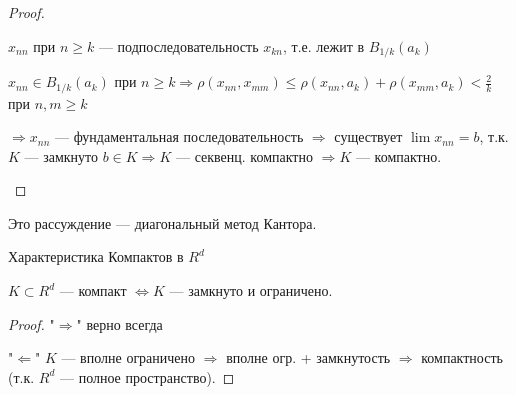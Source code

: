\begin{theorem-non}
\begin{proof}
\begin{enumerate}
            $x_{nn}$ при $n \geqslant k$ --- подпоследовательность $x_{kn}$, т.е. лежит в $B_{1/k}(a_k)$

            $x_{nn} \in B_{1/k}(a_k)$ при $n \geqslant k \Longrightarrow \rho(x_{nn}, x_{mm}) \leqslant \rho(x_{nn}, a_k) + \rho(x_{mm}, a_k) < \frac{2}{k}$ при $n,m \geqslant k$

            $\Longrightarrow x_{nn}$ --- фундаментальная последовательность $\Longrightarrow$ существует $\lim{x_{nn}}= b$, т.к. $K$ --- замкнуто $b \in K \Longrightarrow K$ --- секвенц. компактно $\Longrightarrow K$ --- компактно.
            
            \end{enumerate}    
    \end{proof}

\end{theorem-non}

\notice Это рассуждение --- диагональный метод Кантора.

\begin{follow}
    Характеристика Компактов в $R^d$

    $K \subset R^d$ --- компакт $\Longleftrightarrow K$ --- замкнуто и ограничено.

    \begin{proof}
        "$\Longrightarrow$" верно всегда

        "$\Longleftarrow$" $K$ --- вполне ограничено $\Longrightarrow$ вполне огр. + замкнутость $\Longrightarrow$ компактность (т.к. $R^d$ --- полное пространство).
    \end{proof} 

\end{follow} 
